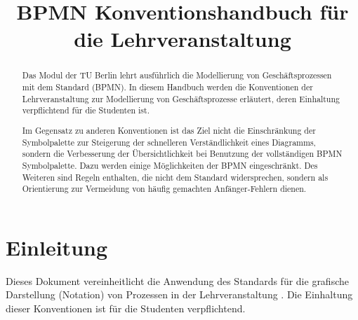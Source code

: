 \documentclass[12pt,report]{snetTeaching}
\title{BPMN Konventionshandbuch für die Lehrveranstaltung \lvname{}}
\date{} %
\begin{document}
\maketitle

\begin{abstract}
\noindent
Das Modul  der TU Berlin lehrt ausführlich die Modellierung von Geschäftsprozessen mit dem Standard  (BPMN). In diesem Handbuch werden die Konventionen der Lehrveranstaltung zur Modellierung von Geschäftsprozesse erläutert, deren Einhaltung verpflichtend für die Studenten ist.

Im Gegensatz zu anderen Konventionen ist das Ziel nicht die Einschränkung der Symbolpalette zur Steigerung der schnelleren Verständlichkeit eines Diagramms, sondern die Verbesserung der Übersichtlichkeit bei Benutzung der vollständigen BPMN Symbolpalette. Dazu werden einige Möglichkeiten der BPMN eingeschränkt. Des Weiteren sind  Regeln enthalten, die nicht dem Standard widersprechen, sondern als Orientierung zur Vermeidung von häufig gemachten Anfänger-Fehlern dienen.



\end{abstract}





\setcounter{secnumdepth}{3}

\tableofcontents

\glsaddall
\printglossary[
	title={Synonyme}
]


\chapter{Einleitung}



Dieses Dokument vereinheitlicht die Anwendung des Standards  für die grafische Darstellung (Notation) von Prozessen in der Lehrveranstaltung . Die Einhaltung dieser Konventionen ist für die Studenten verpflichtend.
\end{document}
